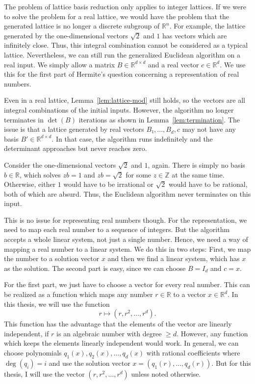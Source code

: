 The problem of lattice basis reduction only applies to integer lattices.
If we were to solve the problem for a real lattice,
we would have the problem that the generated lattice is no longer a discrete subgroup of $ℝ^n$.
For example, the lattice generated by the one-dimensional vectors $\sqrt{2}$ and $1$
has vectors which are infinitely close.
Thus, this integral combination cannot be considered as a typical lattice.
Nevertheless,
we can still run the generalized Euclidean algorithm on a real input.
We simply allow a matrix $B ∈ ℝ^{d×d}$ and a real vector $c ∈ ℝ^d$.
We use this for the first part of Hermite's question concerning a
representation of real numbers.

Even in a real lattice,
Lemma~\ref{lem:lattice-mod} still holds,
so the vectors are all integral combinations of the initial inputs.
However, the algorithm no longer terminates in $\det(B)$ iterations
as shown in Lemma~\ref{lem:termination}.
The issue is that a lattice generated by
real vectors $B₁, …, B_d, c$ may not have any basis $B' ∈ ℝ^{d×d}$.
In that case, the algorithm runs indefinitely and the determinant approaches
but never reaches zero.

\begin{example}
  Consider the one-dimensional vectors $\sqrt{2}$ and $1$, again.
  There is simply no basis $b ∈ ℝ$,
  which solves $zb = 1$ and $zb = \sqrt{2}$ for some $z ∈ ℤ$ at the same time.
  Otherwise, either $1$ would have to be irrational or $\sqrt{2}$ would have to be rational,
  both of which are absurd.
  Thus, the Euclidean algorithm never terminates on this input.
\end{example}

This is no issue for representing real numbers though.
For the representation,
we need to map each real number to a sequence of integers.
But the algorithm accepts a whole linear system,
not just a single number.
Hence, we need a way of mapping a real number to a linear system.
We do this in two steps:
First, we map the number to a solution vector $x$
and then we find a linear system,
which has $x$ as the solution.
The second part is easy,
since we can choose $B = I_d$ and $c = x$.

For the first part, we just have to choose a vector for every real number.
This can be realized as a function which maps any number $r ∈ ℝ$ to a vector $x ∈ ℝ^d$.
In this thesis, we will use the function
\[
  r ↦ (r, r^2, …, r^d).
\]
This function has the advantage that the elements of the vector are linearly independent,
if $r$ is an algebraic number with degree $≥ d$.
However, any function which keeps the elements linearly independent would work.
In general, we can choose polynomials $q_1(x), q_2(x), …, q_d(x)$ with rational
coefficients where $\deg(q_i) = i$ and
use the solution vector $x = (q_1(r), …, q_d(r))$.
But for this thesis, I will use the vector $(r, r^2, …, r^d)$ unless noted otherwise.

